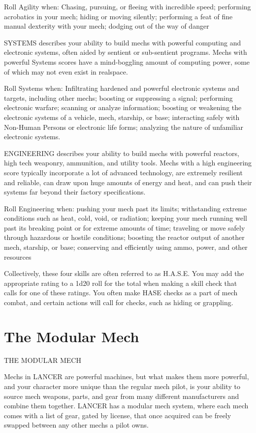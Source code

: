 Roll Agility when: Chasing, pursuing, or fleeing with incredible speed; performing acrobatics in
your mech; hiding or moving silently; performing a feat of fine manual dexterity with your mech;
dodging out of the way of danger

SYSTEMS describes your ability to build mechs with powerful computing and electronic systems,
often aided by sentient or sub-sentient programs. Mechs with powerful Systems scores have a
mind-boggling amount of computing power, some of which may not even exist in realspace.

Roll Systems when: Infiltrating hardened and powerful electronic systems and targets, including
other mechs; boosting or suppressing a signal; performing electronic warfare; scanning or analyze
information; boosting or weakening the electronic systems of a vehicle, mech, starship, or base;
interacting safely with Non-Human Persons or electronic life forms; analyzing the nature of
unfamiliar electronic systems.




ENGINEERING describes your ability to build mechs with powerful reactors, high tech weaponry,
ammunition, and utility tools. Mechs with a high engineering score typically incorporate a lot of
advanced technology, are extremely resilient and reliable, can draw upon huge amounts of energy
and heat, and can push their systems far beyond their factory specifications.

Roll Engineering when: pushing your mech past its limits; withstanding extreme conditions such
as heat, cold, void, or radiation; keeping your mech running well past its breaking point or for
extreme amounts of time; traveling or move safely through hazardous or hostile conditions;
boosting the reactor output of another mech, starship, or base; conserving and efficiently using
ammo, power, and other resources

Collectively, these four skills are often referred to as H.A.S.E. You may add the appropriate rating
to a 1d20 roll for the total when making a skill check that calls for one of these ratings. You often
make HASE checks as a part of mech combat, and certain actions will call for checks, such as
hiding or grappling.

\chapter{The Modular Mech}
  THE MODULAR MECH

Mechs in LANCER are powerful machines, but what makes them more powerful, and your
character more unique than the regular mech pilot, is your ability to source mech weapons, parts,
and gear from many different manufacturers and combine them together. LANCER has a
modular mech system, where each mech comes with a list of gear, gated by license, that once
acquired can be freely swapped between any other mechs a pilot owns.

